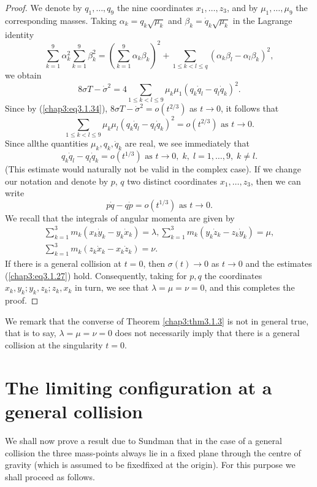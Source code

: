 \begin{proof}
We denote by $q_1, \ldots, q_9$ the nine coordinates $x_1, \ldots,
z_3$, and by $\mu_1, \ldots, \mu_9$ the corresponding masses. Taking
$\alpha_k = q_k \sqrt{\mu_k}$ and $\beta_k = \dot{q}_k \sqrt{\mu_k}$
in the Lagrange identity 
$$
\sum\limits^9_{k=1} \alpha^2_k \sum\limits^9_{k=1} \beta^2_k =
\left(\sum\limits^9_{k=1} \alpha_k \beta_k \right)^2 +
\sum\limits_{1\leq k < l \leq q} \left(\alpha_k \beta_l - \alpha_l
\beta_k \right)^2,  
$$
we obtain
$$
8 \sigma T - \dot{\sigma}^2 = 4 \sum\limits_{1 \leq k < l \leq 9}
\mu_k \mu_1 (q_k \dot{q}_l - q_l\dot{q}_k)^2.  
$$
Since by (\ref{chap3:eq3.1.34}), $8 \sigma T - \dot{\sigma}^2 = o
(t^{2/3})$ as $t \to 0$, it follows that  
$$
\sum\limits_{1\leq k < l \leq 9} \mu_k \mu_l (q_k \dot{q}_l - q_l
\dot{q}_k)^2 = o (t^{2/3}) \text{ as } t \to 0.  
$$
Since all\pageoriginale the quantities $\mu_k, q_k, \dot{q}_k$ are
real, we see immediately that 
$$
q_k \dot{q}_l - q_l \dot{q}_k  = o (t^{1/3}) \text{ as } t \to 0, \;
k, \; l =1, \ldots, 9 , \; k  \neq l.  
$$
(This estimate would naturally not be valid in the complex case). If
we change our notation and denote by $p$, $q$ two distinct coordinates
$x_1, \ldots, z_3$, then we can write 
\begin{equation*}
p\dot{q} - q\dot{p} = o (t^{1/3}) \text{ as } t \to
0. \tag{3.1.37}\label{chap3:eq3.1.37} 
\end{equation*}
We recall that the integrals of angular momenta are given by 
\begin{gather*}
\sum\limits^3_{k=1} m_k (x_k \dot{y}_k - y_k \dot{x}_k) = \lambda,
\sum\limits^3_{k=1} m_k (y_k \dot{z}_k - z_k \dot{y}_k) = \mu, \\ 
\sum\limits^3_{k=1} m_k (z_k \dot{x}_k - x_k \dot{z}_k) = \nu. 
\end{gather*}
If there is a general collision at $t = 0$, then $\sigma (t) \to 0$ as
$t \to 0$ and the estimates (\ref{chap3:eq3.1.27}) hold. Consequently,
taking for $p,q$ the coordinates $x_k, y_k; y_k, z_k ; z_k, x_k$ in
turn, we see that $\lambda = \mu = \nu = 0$, and this completes the
proof. 
\end{proof}

We remark that the converse of Theorem \ref{chap3:thm3.1.3} is not in
general true, that is to say, $\lambda = \mu = \nu = 0$ does not
necessarily imply that there is a general collision at the singularity
$t = 0$.  

\section{The limiting configuration at a general collision}\label{chap3:sec2}
We shall now prove a result due to Sundman that in the case of a
general collision the three mass-points always lie in a fixed plane
through the centre of gravity (which is assumed to be
fixed\pageoriginale fixed at the origin). For this purpose we shall
proceed as follows.  

